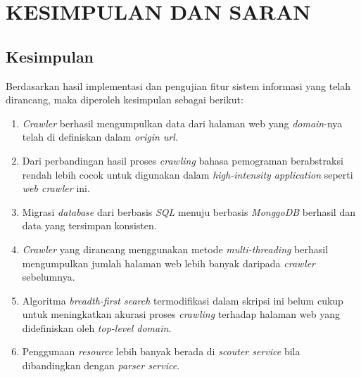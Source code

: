 
\chapter{KESIMPULAN DAN SARAN}

\section{Kesimpulan}
Berdasarkan hasil implementasi dan pengujian fitur sistem informasi yang telah dirancang, maka diperoleh kesimpulan sebagai berikut:

\begin{enumerate}
  \item \emph{Crawler} berhasil mengumpulkan data dari halaman web yang \emph{domain}-nya telah di definiskan dalam \emph{origin url}.
  \item Dari perbandingan hasil proses \emph{crawling} bahasa pemograman berabstraksi rendah lebih cocok untuk digunakan dalam \emph{high-intensity application} seperti \emph{web crawler} ini.
  \item Migrasi \emph{database} dari berbasis \emph{SQL} menuju berbasis \emph{MonggoDB} berhasil dan data yang tersimpan konsisten.
  \item \emph{Crawler} yang dirancang menggunakan metode \emph{multi-threading} berhasil mengumpulkan jumlah halaman web lebih banyak daripada \emph{crawler} sebelumnya.
  \item Algoritma \emph{breadth-first search} termodifikasi dalam skripsi ini belum cukup untuk meningkatkan akurasi proses \emph{crawling} terhadap halaman web yang didefiniskan oleh \emph{top-level domain}.
  \item Penggunaan \emph{resource} lebih banyak berada di \emph{scouter service} bila dibandingkan dengan \emph{parser service}.
\end{enumerate}

